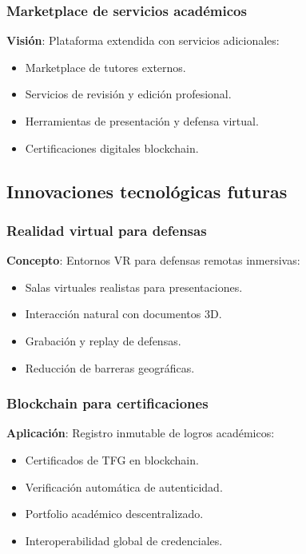 \documentclass[12pt,a4paper,oneside]{report}
\providecommand{\tightlist}{%
  \setlength{\itemsep}{0pt}\setlength{\parskip}{0pt}}
\begin{document}
\subsubsection{Marketplace de servicios
académicos}\label{marketplace-de-servicios-acaduxe9micos}

\textbf{Visión}: Plataforma extendida con servicios adicionales:

\begin{itemize}
\tightlist
\item
  Marketplace de tutores externos.
\item
  Servicios de revisión y edición profesional.
\item
  Herramientas de presentación y defensa virtual.
\item
  Certificaciones digitales blockchain.
\end{itemize}

\subsection{Innovaciones tecnológicas
futuras}\label{innovaciones-tecnoluxf3gicas-futuras}

\subsubsection{Realidad virtual para
defensas}\label{realidad-virtual-para-defensas}

\textbf{Concepto}: Entornos VR para defensas remotas inmersivas:

\begin{itemize}
\tightlist
\item
  Salas virtuales realistas para presentaciones.
\item
  Interacción natural con documentos 3D.
\item
  Grabación y replay de defensas.
\item
  Reducción de barreras geográficas.
\end{itemize}

\subsubsection{Blockchain para
certificaciones}\label{blockchain-para-certificaciones}

\textbf{Aplicación}: Registro inmutable de logros académicos:

\begin{itemize}
\tightlist
\item
  Certificados de TFG en blockchain.
\item
  Verificación automática de autenticidad.
\item
  Portfolio académico descentralizado.
\item
  Interoperabilidad global de credenciales.
\end{itemize}
\end{document}
